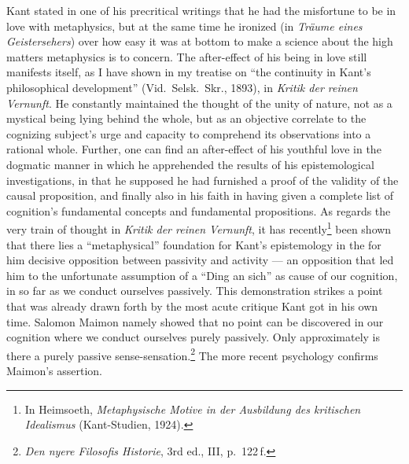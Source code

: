 \documentclass[12pt]{book}
\newcommand{\opage}[1]{\marginnote{\footnotesize\textit{[#1]}}}
\begin{document}
Kant stated in one of his precritical writings that he had the misfortune to be in love with metaphysics, but
at the same time he ironized (in \textit{Träume eines Geistersehers}) over how easy it was at bottom to make
a science about the high matters metaphysics is to concern. The after-effect of his being in love still manifests
itself, as I have shown in my treatise on ``the continuity in Kant's philosophical
development'' (Vid.\ Selsk.\ Skr., 1893), in \textit{Kritik der reinen Vernunft}. He constantly maintained the
thought of the unity of nature, not as a mystical being lying behind the whole, but as an objective
correlate to the cognizing subject's urge and capacity to comprehend its observations into a rational whole.
Further, one can find an after-effect of his youthful love in the dogmatic manner in which he apprehended the
results of his epistemological investigations, in that he supposed he had furnished a proof of the validity of
the causal proposition, and finally also in his faith in having given a complete list of cognition's
fundamental concepts and fundamental propositions. As regards the very train of thought in \textit{Kritik der
reinen Vernunft}, it has recently\footnote{In Heimsoeth, \textit{Metaphysische Motive in der Ausbildung des
kritischen Idealismus} (Kant-Studien, 1924).} been shown that there lies a ``metaphysical'' foundation for
Kant's epistemology in the for him decisive opposition \opage{87}between passivity and activity --- an opposition that
led him to the unfortunate assumption of a ``Ding an sich'' as cause of our cognition, in so far as we
conduct ourselves passively. This demonstration strikes a point that was already drawn forth by the most
acute critique Kant got in his own time. Salomon Maimon namely showed that no point can be discovered in our
cognition where we conduct ourselves purely passively. Only approximately is there a purely passive
sense-sensation.\footnote{\textit{Den nyere Filosofis Historie}, 3rd ed., III, p.\ 122\,f.} The more recent
psychology confirms Maimon's assertion.
\end{document}

